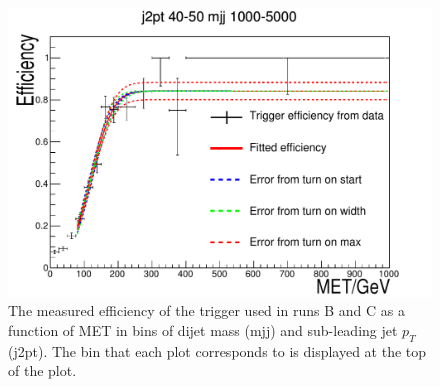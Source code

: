 \begin{figure}[h!]
\begin{center}
    \includegraphics[width=.6\largefigwidth]{plots/parked/trigfitplots/hData_MET_1D_25BC.pdf}
    \caption{The measured efficiency of the trigger used in runs B and C as a function of MET in bins of dijet mass (mjj) and sub-leading jet $p_{T}$ (j2pt). The bin that each plot corresponds to is displayed at the top of the plot.}
    \label{fig:trigfitplotsBC1}
  \end{center}
\end{figure}

